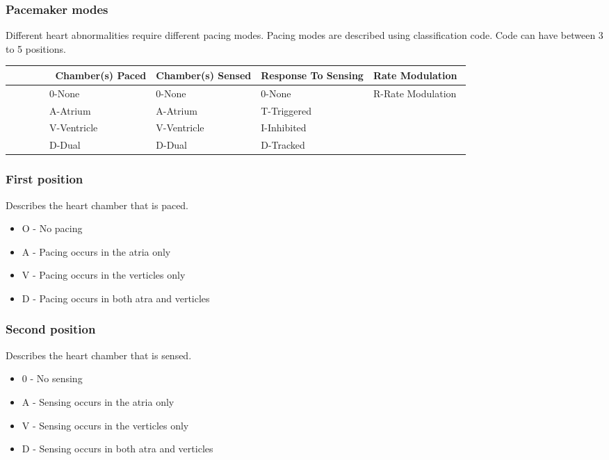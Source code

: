 \documentclass[xcolor=dvipsnames]{beamer}
\begin{document}
  \begin{frame}{}
    \frametitle{Pacemaker modes}
    Different heart abnormalities require different pacing modes. Pacing modes are described using classification code. Code can have between 3 to 5 positions.

    \begin{tabularx}{\textwidth}{|X|X|X|X|}
      \hline
              Chamber(s) Paced & Chamber(s) Sensed & Response To Sensing & Rate Modulation  \\ \hline
              0-None           & 0-None            & 0-None              & \multirow{2}{2cm}{R-Rate Modulation}  \\ %
              A-Atrium         & A-Atrium          & T-Triggered         &                    \\ %
              V-Ventricle      & V-Ventricle       & I-Inhibited         &                    \\ %
              D-Dual           & D-Dual            & D-Tracked           &                  \\
      \hline
    \end{tabularx}

  \end{frame}

  \begin{frame}
    \frametitle{First position}
Describes the heart chamber that is paced.
\begin{itemize}
  \item O - No pacing
      \item A - Pacing occurs in the atria only
      \item V - Pacing occurs in the verticles only
      \item D - Pacing occurs in both atra and verticles
\end{itemize}
  \end{frame}

  \begin{frame}
    \frametitle{Second position}
Describes the heart chamber that is sensed.
\begin{itemize}
  \item 0 - No sensing
  \item A - Sensing occurs in the atria only
  \item V - Sensing occurs in the verticles only
  \item D - Sensing occurs in both atra and verticles
\end{itemize}

  \end{frame}
\end{document}
